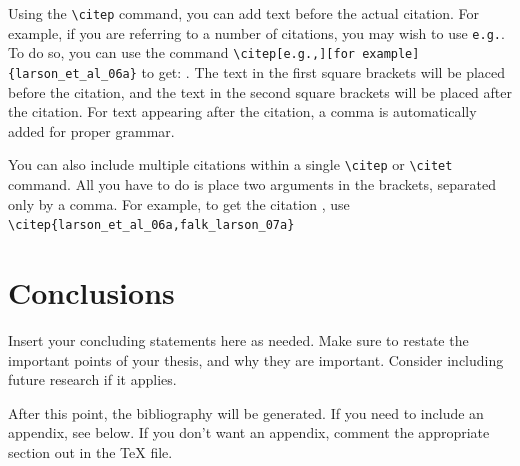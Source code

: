 \documentclass[master]{UWMThesis}
\begin{document}
Using the \verb=\citep= command, you can add text before the actual citation.  For example, if you are referring to a number of citations, you may wish to use \verb=e.g.=.  To do so, you can use the command \verb=\citep[e.g.,][for example]{larson_et_al_06a}= to get: \citep[e.g.,][for example]{larson_et_al_06a}.  The text in the first square brackets will be placed before the citation, and the text in the second square brackets will be placed after the citation.  For text appearing after the citation, a comma is automatically added for proper grammar.

You can also include multiple citations within a single \verb=\citep= or \verb=\citet= command. All you have to do is place two arguments in the brackets, separated only by a comma.  For example, to get the citation \citep{larson_et_al_06a,falk_larson_07a}, use \verb=\citep{larson_et_al_06a,falk_larson_07a}=




\chapter{Conclusions}

Insert your concluding statements here as needed.  Make sure to restate the important points of your thesis, and why they are important.  Consider including future research if it applies.

After this point, the bibliography will be generated.  If you need to include an appendix, see below.  If you don't want an appendix, comment the appropriate section out in the TeX file.


\backmatter 





\end{document}
